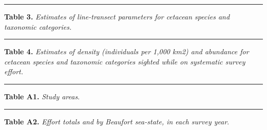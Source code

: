 \documentclass[
]{book}
\newenvironment{Shaded}{\begin{snugshade}}{\end{snugshade}}
\newcommand{\NormalTok}[1]{#1}
\newcommand{\OperatorTok}[1]{\textcolor[rgb]{0.81,0.36,0.00}{\textbf{#1}}}
\begin{document}
\begin{center}\rule{0.5\linewidth}{0.5pt}\end{center}

\textbf{Table 3.} \emph{Estimates of line-transect parameters for cetacean species and taxonomic categories.}

\begin{Shaded}
\end{Shaded}

\begin{center}\rule{0.5\linewidth}{0.5pt}\end{center}

\textbf{Table 4.} \emph{Estimates of density (individuals per 1,000 km2) and abundance for cetacean species and taxonomic categories sighted while on systematic survey effort.}

\begin{Shaded}
\end{Shaded}

\begin{center}\rule{0.5\linewidth}{0.5pt}\end{center}

\textbf{Table A1.} \emph{Study areas}.

\begin{Shaded}
\end{Shaded}

\begin{center}\rule{0.5\linewidth}{0.5pt}\end{center}

\textbf{Table A2.} \emph{Effort totals and by Beaufort sea-state, in each survey year}.
\end{document}
